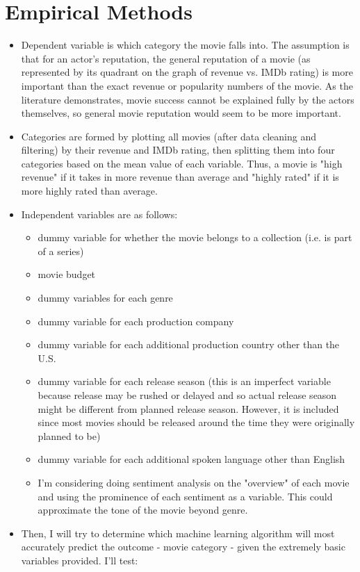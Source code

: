 \documentclass{article}
\begin{document}
\section{Empirical Methods}
\begin{itemize}
    \item Dependent variable is which category the movie falls into. The assumption is that for an actor's reputation, the general reputation of a movie (as represented by its quadrant on the graph of revenue vs. IMDb rating) is more important than the exact revenue or popularity numbers of the movie. As the literature demonstrates, movie success cannot be explained fully by the actors themselves\cite{lash}, so general movie reputation would seem to be more important.
    \item Categories are formed by plotting all movies (after data cleaning and filtering) by their revenue and IMDb rating, then splitting them into four  categories based on the mean value of each variable. Thus, a movie is "high revenue" if it takes in more revenue than average and "highly rated" if it is more highly rated than average.
    \item Independent variables are as follows:
    \begin{itemize}
        \item dummy variable for whether the movie belongs to a collection (i.e. is part of a series)
        \item movie budget
        \item dummy variables for each genre
        \item dummy variable for each production company
        \item dummy variable for each additional production country other than the U.S.
        \item dummy variable for each release season (this is an imperfect variable because release may be rushed or delayed and so actual release season might be different from planned release season. However, it is included since most movies should be released around the time they were originally planned to be)
        \item dummy variable for each additional spoken language other than English
        \item I'm considering doing sentiment analysis on the "overview" of each movie and using the prominence of each sentiment as a variable. This could approximate the tone of the movie beyond genre.
    \end{itemize}
    \item Then, I will try to determine which machine learning algorithm will most accurately predict the outcome - movie category - given the extremely basic variables provided. I'll test:

\end{itemize}
\end{document}
